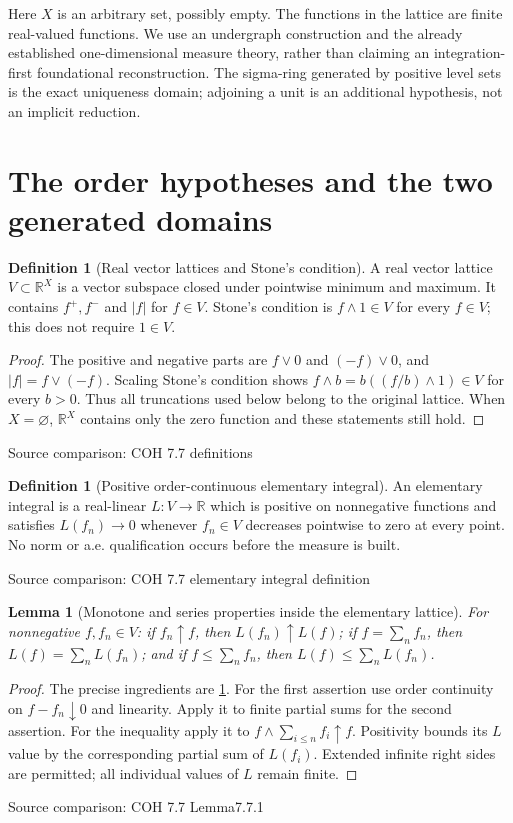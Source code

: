 \documentclass[11pt,oneside,openany]{book}
\newtheorem{lemma}[theorem]{Lemma}
\theoremstyle{definition}
\newtheorem{definition}[theorem]{Definition}
\theoremstyle{remark}
\newcounter{foundation}\renewcommand{\thefoundation}{F\arabic{foundation}}
\newcommand{\R}{\mathbb R}\newcommand{\C}{\mathbb C}
\newcommand{\family}[1]{}
\newcommand{\source}[1]{\par\begingroup\small\sffamily\color{black!65}Source comparison: #1\par\endgroup}
\begin{document}
Here $X$ is an arbitrary set, possibly empty. The functions in the lattice are finite real-valued functions. We use an undergraph construction and the already established one-dimensional measure theory, rather than claiming an integration-first foundational reconstruction. The sigma-ring generated by positive level sets is the exact uniqueness domain; adjoining a unit is an additional hypothesis, not an implicit reduction.

\section{The order hypotheses and the two generated domains}

\begin{definition}[Real vector lattices and Stone's condition]\family{D11.23.vector_lattice_stone}\label{d11:23:vector-lattice-stone}
A real vector lattice $V\subset\R^X$ is a vector subspace closed under pointwise minimum and maximum. It contains $f^+,f^-$ and $|f|$ for $f\in V$. Stone's condition is $f\wedge1\in V$ for every $f\in V$; this does not require $1\in V$.
\end{definition}
\begin{proof}
The positive and negative parts are $f\vee0$ and $(-f)\vee0$, and $|f|=f\vee(-f)$. Scaling Stone's condition shows $f\wedge b=b((f/b)\wedge1)\in V$ for every $b>0$. Thus all truncations used below belong to the original lattice. When $X=\varnothing$, $\R^X$ contains only the zero function and these statements still hold.
\end{proof}
\source{COH 7.7 definitions}

\begin{definition}[Positive order-continuous elementary integral]\family{D11.23.elementary_integral}\label{d11:23:elementary-integral}
An elementary integral is a real-linear $L:V\to\R$ which is positive on nonnegative functions and satisfies $L(f_n)\to0$ whenever $f_n\in V$ decreases pointwise to zero at every point. No norm or a.e. qualification occurs before the measure is built.
\end{definition}
\source{COH 7.7 elementary integral definition}

\begin{lemma}[Monotone and series properties inside the elementary lattice]\family{D11.23.elementary_monotone_properties}\label{d11:23:elementary-monotone-properties}
For nonnegative $f,f_n\in V$: if $f_n\uparrow f$, then $L(f_n)\uparrow L(f)$; if $f=\sum_nf_n$, then $L(f)=\sum_nL(f_n)$; and if $f\le\sum_nf_n$, then $L(f)\le\sum_nL(f_n)$.
\end{lemma}
\begin{proof}
The precise ingredients are \cref{d11:23:elementary-integral}. For the first assertion use order continuity on $f-f_n\downarrow0$ and linearity. Apply it to finite partial sums for the second assertion. For the inequality apply it to $f\wedge\sum_{i\le n}f_i\uparrow f$. Positivity bounds its $L$ value by the corresponding partial sum of $L(f_i)$. Extended infinite right sides are permitted; all individual values of $L$ remain finite.
\end{proof}
\source{COH 7.7 Lemma7.7.1}
\end{document}
